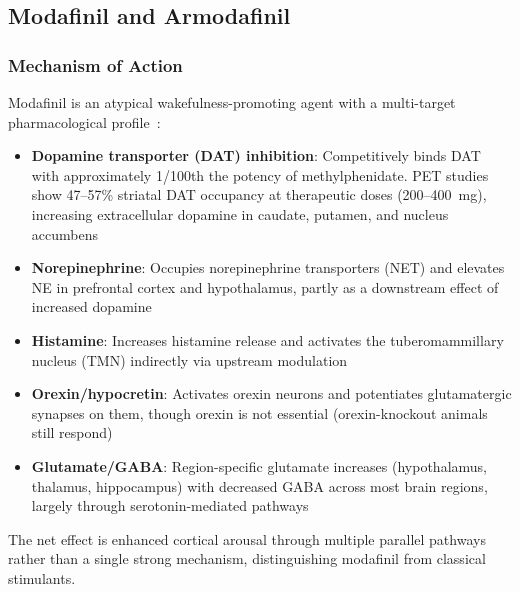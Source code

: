 \subsection{Modafinil and Armodafinil}
\label{subsec:modafinil}

\subsubsection{Mechanism of Action}

Modafinil is an atypical wakefulness-promoting agent with a multi-target pharmacological profile~\cite{Minzenberg2008modafinil}:

\begin{itemize}
    \item \textbf{Dopamine transporter (DAT) inhibition}: Competitively binds DAT with approximately 1/100th the potency of methylphenidate. PET studies show 47--57\% striatal DAT occupancy at therapeutic doses (200--400~mg), increasing extracellular dopamine in caudate, putamen, and nucleus accumbens~\cite{Volkow2009modafinil}
    \item \textbf{Norepinephrine}: Occupies norepinephrine transporters (NET) and elevates NE in prefrontal cortex and hypothalamus, partly as a downstream effect of increased dopamine~\cite{Wisor2013modafinilcatecholaminergic}
    \item \textbf{Histamine}: Increases histamine release and activates the tuberomammillary nucleus (TMN) indirectly via upstream modulation
    \item \textbf{Orexin/hypocretin}: Activates orexin neurons and potentiates glutamatergic synapses on them, though orexin is not essential (orexin-knockout animals still respond)
    \item \textbf{Glutamate/GABA}: Region-specific glutamate increases (hypothalamus, thalamus, hippocampus) with decreased GABA across most brain regions, largely through serotonin-mediated pathways
\end{itemize}

The net effect is enhanced cortical arousal through multiple parallel pathways rather than a single strong mechanism, distinguishing modafinil from classical stimulants.

